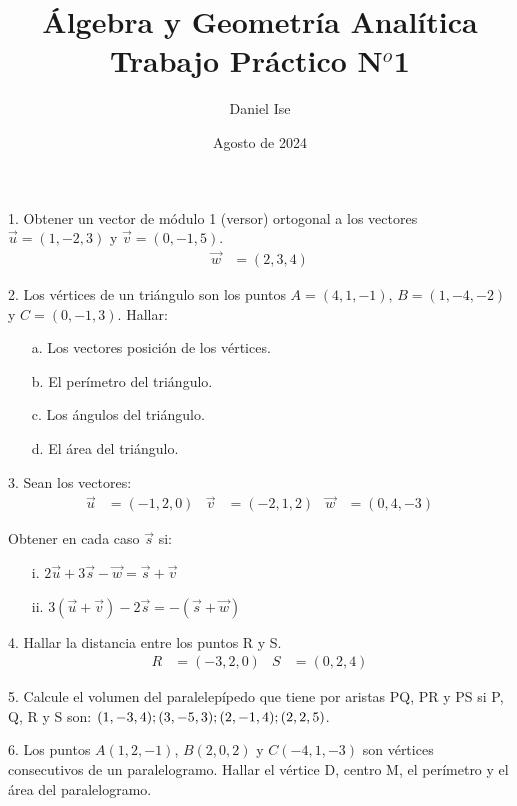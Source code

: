 \documentclass{article}
\title{Álgebra y Geometría Analítica\\ Trabajo Práctico N$^o$1}
\author{Daniel Ise}
\date{Agosto de 2024}
\begin{document}
\maketitle

1. Obtener un vector de módulo 1 (versor) ortogonal a los vectores 
$\vec{u} = (1, -2, 3)$ y $\vec{v} = (0, -1, 5)$.
\begin{align*}
    \vec{w} &= (2, 3, 4)
\end{align*}

2. Los vértices de un triángulo son los puntos $A = (4,1,-1)$,
$B = (1,-4,-2)$ y $C = (0,-1,3)$. Hallar: 
\begin{itemize}
    \item[a.] Los vectores posición de los vértices.
    \item[b.] El perímetro del triángulo.
    \item[c.] Los ángulos del triángulo.
    \item[d.] El área del triángulo.
\end{itemize}

3. Sean los vectores:
\begin{align*}
    \vec{u} &= (-1,2,0) & \vec{v} &= (-2, 1, 2) & \vec{w} &= (0, 4, -3)
\end{align*}

Obtener en cada caso $\vec{s}$ si:

\begin{itemize}
    \item[i.]  $2\vec{u} + 3 \vec{s} - \vec{w} = \vec{s} + \vec{v}$
    \item[ii.] $3(\vec{u}+\vec{v}) - 2 \vec{s} = -(\vec{s} + \vec{w})$
\end{itemize}

4. Hallar la distancia entre los puntos R y S.
\begin{align*}
    R &= (-3,2,0) & S &= (0, 2, 4)
\end{align*}

5. Calcule el volumen del paralelepípedo que tiene por aristas PQ, PR y PS si
P, Q, R y S son: $(1, -3, 4);\\(3,-5,3); (2,-1,4); (2,2,5)$.

6. Los puntos $A (1,2,-1)$, $B(2,0,2)$ y $C(-4,1,-3)$ son vértices consecutivos
de un paralelogramo. Hallar el vértice D, centro M, el perímetro y el área del
paralelogramo.
\end{document}
